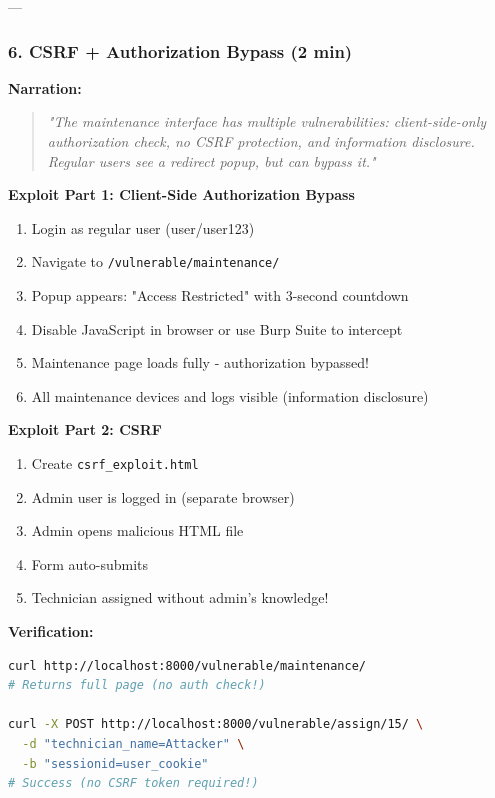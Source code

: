 \documentclass[12pt,a4paper]{article}
\begin{document}
---

\subsubsection{6. CSRF + Authorization Bypass (2 min)}

\textbf{Narration:}
\begin{quote}
\textit{"The maintenance interface has multiple vulnerabilities: client-side-only authorization check, no CSRF protection, and information disclosure. Regular users see a redirect popup, but can bypass it."}
\end{quote}

\textbf{Exploit Part 1: Client-Side Authorization Bypass}
\begin{enumerate}
    \item Login as regular user (user/user123)
    \item Navigate to \texttt{/vulnerable/maintenance/}
    \item Popup appears: "Access Restricted" with 3-second countdown
    \item Disable JavaScript in browser or use Burp Suite to intercept
    \item Maintenance page loads fully - authorization bypassed!
    \item All maintenance devices and logs visible (information disclosure)
\end{enumerate}

\textbf{Exploit Part 2: CSRF}
\begin{enumerate}
    \item Create \texttt{csrf\_exploit.html}
    \item Admin user is logged in (separate browser)
    \item Admin opens malicious HTML file
    \item Form auto-submits
    \item Technician assigned without admin's knowledge!
\end{enumerate}

\textbf{Verification:}
\begin{lstlisting}[language=bash]
curl http://localhost:8000/vulnerable/maintenance/
# Returns full page (no auth check!)

curl -X POST http://localhost:8000/vulnerable/assign/15/ \
  -d "technician_name=Attacker" \
  -b "sessionid=user_cookie"
# Success (no CSRF token required!)
\end{lstlisting}
\end{document}
